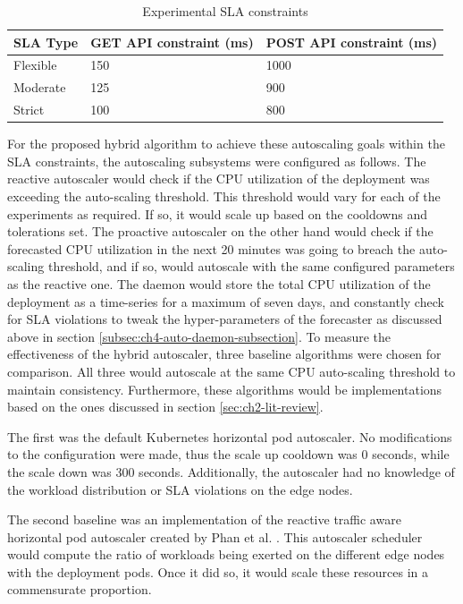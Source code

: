 \begin{table}
    \caption{Experimental SLA constraints}\label{tab:experiment-sla-values}
    \centering
    \begin{tabular}{|l|l|l|}
        \hline
        SLA Type & GET API constraint (ms) & POST API constraint (ms)\\
        \hline
        Flexible    & 150   & 1000\\
        Moderate    & 125   & 900\\
        Strict      & 100   & 800\\
        \hline
    \end{tabular}
\end{table}

For the proposed hybrid algorithm to achieve these autoscaling goals within the SLA constraints, the autoscaling subsystems were configured as follows. The reactive autoscaler would check if the CPU utilization of the deployment was exceeding the auto-scaling threshold. This threshold would vary for each of the experiments as required. If so, it would scale up based on the cooldowns and tolerations set. The proactive autoscaler on the other hand would check if the forecasted CPU utilization in the next 20 minutes was going to breach the auto-scaling threshold, and if so, would autoscale with the same configured parameters as the reactive one. The daemon would store the total CPU utilization of the deployment as a time-series for a maximum of seven days, and constantly check for SLA violations to tweak the hyper-parameters of the forecaster as discussed above in section \ref{subsec:ch4-auto-daemon-subsection}. To measure the effectiveness of the hybrid autoscaler, three baseline algorithms were chosen for comparison. All three would autoscale at the same CPU auto-scaling threshold to maintain consistency. Furthermore, these algorithms would be implementations based on the ones discussed in section \ref{sec:ch2-lit-review}.\par

The first was the default Kubernetes horizontal pod autoscaler. No modifications to the configuration were made, thus the scale up cooldown was 0 seconds, while the scale down was 300 seconds. Additionally, the autoscaler had no knowledge of the workload distribution or SLA violations on the edge nodes.\par

The second baseline was an implementation of the reactive traffic aware horizontal pod autoscaler created by Phan et al. \cite{phan2022traffic}. This autoscaler scheduler would compute the ratio of workloads being exerted on the different edge nodes with the deployment pods. Once it did so, it would scale these resources in a commensurate proportion.\par

